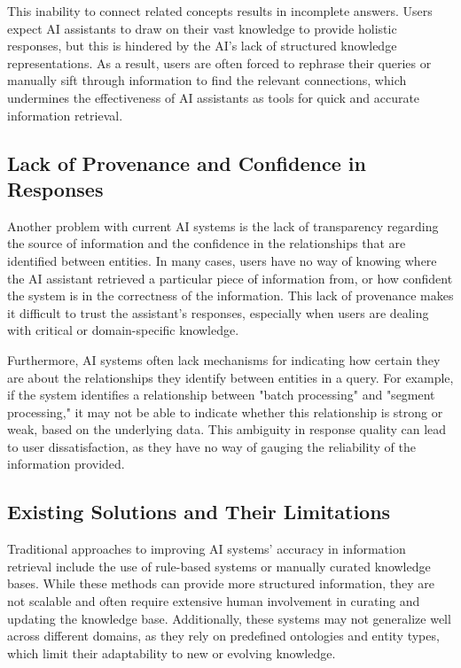 This inability to connect related concepts results in incomplete answers. Users expect AI assistants to draw on their vast knowledge to provide holistic responses, but this is hindered by the AI’s lack of structured knowledge representations. As a result, users are often forced to rephrase their queries or manually sift through information to find the relevant connections, which undermines the effectiveness of AI assistants as tools for quick and accurate information retrieval.

\subsection{Lack of Provenance and Confidence in Responses}

Another problem with current AI systems is the lack of transparency regarding the source of information and the confidence in the relationships that are identified between entities. In many cases, users have no way of knowing where the AI assistant retrieved a particular piece of information from, or how confident the system is in the correctness of the information. This lack of provenance makes it difficult to trust the assistant’s responses, especially when users are dealing with critical or domain-specific knowledge.

Furthermore, AI systems often lack mechanisms for indicating how certain they are about the relationships they identify between entities in a query. For example, if the system identifies a relationship between "batch processing" and "segment processing," it may not be able to indicate whether this relationship is strong or weak, based on the underlying data. This ambiguity in response quality can lead to user dissatisfaction, as they have no way of gauging the reliability of the information provided.

\subsection{Existing Solutions and Their Limitations}

Traditional approaches to improving AI systems’ accuracy in information retrieval include the use of rule-based systems or manually curated knowledge bases. While these methods can provide more structured information, they are not scalable and often require extensive human involvement in curating and updating the knowledge base. Additionally, these systems may not generalize well across different domains, as they rely on predefined ontologies and entity types, which limit their adaptability to new or evolving knowledge.

